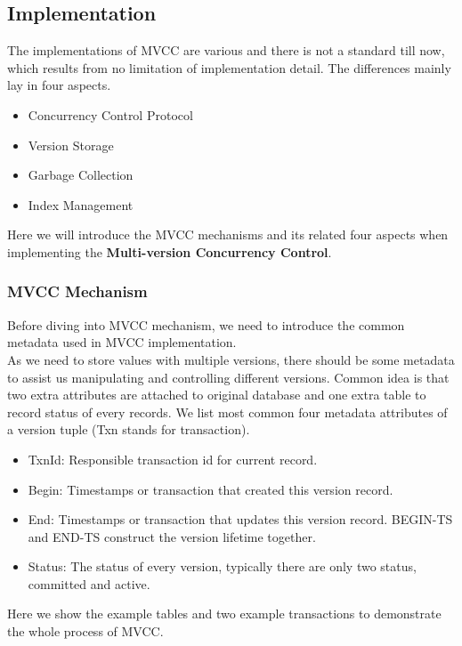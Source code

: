 \subsection{Implementation}
The implementations of MVCC are various and there is not a standard till now, which results from no limitation of implementation detail. The differences mainly lay in four aspects.
\begin{itemize}
	\item Concurrency Control Protocol
	\item Version Storage
	\item Garbage Collection
	\item Index Management
\end{itemize}
Here we will introduce the MVCC mechanisms and its related four aspects when implementing the \textbf{Multi-version Concurrency Control}.
\subsubsection{MVCC Mechanism}
Before diving into MVCC mechanism, we need to introduce the common metadata used in MVCC implementation. \\

As we need to store values with multiple versions, there should be some metadata to assist us manipulating and controlling different versions. Common idea is that two extra attributes are attached to original database and one extra table to record status of every records. We list most common four metadata attributes of a version tuple (Txn stands for transaction).
\begin{itemize}
	\item TxnId: Responsible transaction id for current record.
	\item Begin: Timestamps or transaction that created this version record.
	\item End: Timestamps or transaction that updates this version record. BEGIN-TS and END-TS construct the version lifetime together.
	\item Status: The status of every version, typically there are only two status, committed and active.
\end{itemize}
Here we show the example tables and two example transactions to demonstrate the whole process of MVCC.

